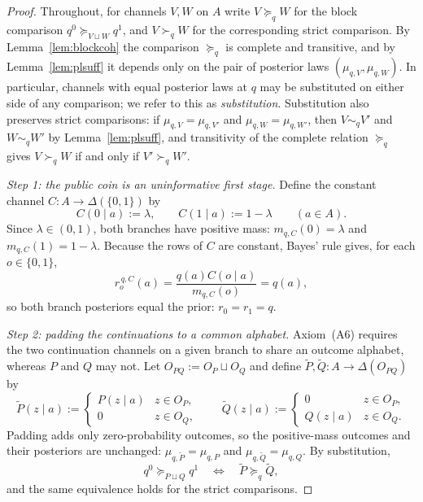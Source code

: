 \documentclass[11pt,a4paper]{article}
\theoremstyle{definition}
\newcommand{\1}{\mathbf 1}
\begin{document}
\begin{proof}
Throughout, for channels $V,W$ on $A$ write $V\succeq_q W$ for the block comparison $q^0\succeq_{V\sqcup W}q^1$, and
$V\succ_q W$ for the corresponding strict comparison.  By Lemma~\ref{lem:blockcoh} the comparison $\succeq_q$ is
complete and transitive, and by Lemma~\ref{lem:plsuff} it depends only on the pair of posterior laws
$(\mu_{q,V},\mu_{q,W})$.  In particular, channels with equal posterior laws at $q$ may be substituted on either side of
any comparison; we refer to this as \emph{substitution}.  Substitution also preserves strict comparisons: if
$\mu_{q,V}=\mu_{q,V'}$ and $\mu_{q,W}=\mu_{q,W'}$, then $V\sim_q V'$ and $W\sim_q W'$ by Lemma~\ref{lem:plsuff}, and
transitivity of the complete relation $\succeq_q$ gives $V\succ_q W$ if and only if $V'\succ_q W'$.

\emph{Step 1: the public coin is an uninformative first stage.}
Define the constant channel $C:A\to\Delta(\{0,1\})$ by
\[
C(0\mid a):=\lambda,
\qquad
C(1\mid a):=1-\lambda
\qquad(a\in A).
\]
Since $\lambda\in(0,1)$, both branches have positive mass: $m_{q,C}(0)=\lambda$ and $m_{q,C}(1)=1-\lambda$.  Because
the rows of $C$ are constant, Bayes' rule gives, for each $o\in\{0,1\}$,
\[
r_o^{\,q,C}(a)=\frac{q(a)C(o\mid a)}{m_{q,C}(o)}=q(a),
\]
so both branch posteriors equal the prior: $r_0=r_1=q$.

\emph{Step 2: padding the continuations to a common alphabet.}
Axiom~\textup{(A6)} requires the two continuation channels on a given branch to share an outcome alphabet, whereas $P$
and $Q$ may not.  Let $O_{PQ}:=O_P\sqcup O_Q$ and define $\widetilde P,\widetilde Q:A\to\Delta(O_{PQ})$ by
\[
\widetilde P(z\mid a):=
\begin{cases}
P(z\mid a)&z\in O_P,\\
0&z\in O_Q,
\end{cases}
\qquad
\widetilde Q(z\mid a):=
\begin{cases}
0&z\in O_P,\\
Q(z\mid a)&z\in O_Q.
\end{cases}
\]
Padding adds only zero-probability outcomes, so the positive-mass outcomes and their posteriors are unchanged:
$\mu_{q,\widetilde P}=\mu_{q,P}$ and $\mu_{q,\widetilde Q}=\mu_{q,Q}$.  By substitution,
\[
q^0\succeq_{P\sqcup Q}q^1
\quad\Longleftrightarrow\quad
\widetilde P\succeq_q\widetilde Q,
\]
and the same equivalence holds for the strict comparisons.


\end{proof}
\end{document}
